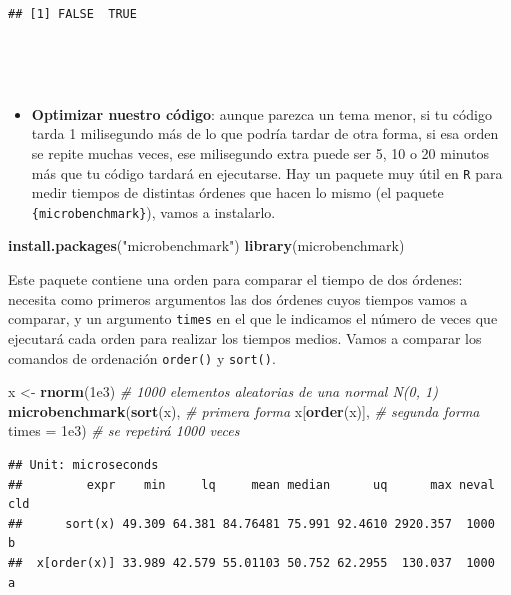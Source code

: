 \documentclass[11pt,]{book}
\newenvironment{Shaded}{\begin{snugshade}}{\end{snugshade}}
\newcommand{\CommentTok}[1]{\textcolor[rgb]{0.37,0.37,0.37}{\textit{#1}}}
\newcommand{\DataTypeTok}[1]{\textcolor[rgb]{0.27,0.27,0.27}{#1}}
\newcommand{\FloatTok}[1]{\textcolor[rgb]{0.06,0.06,0.06}{#1}}
\newcommand{\KeywordTok}[1]{\textcolor[rgb]{0.27,0.27,0.27}{\textbf{#1}}}
\newcommand{\NormalTok}[1]{#1}
\newcommand{\StringTok}[1]{\textcolor[rgb]{0.5,0.5,0.5}{#1}}
\providecommand{\tightlist}{%
  \setlength{\itemsep}{0pt}\setlength{\parskip}{0pt}}
\begin{document}
\begin{verbatim}
## [1] FALSE  TRUE
\end{verbatim}

~

~

\begin{itemize}
\tightlist
\item
  \textbf{Optimizar nuestro código}: aunque parezca un tema menor, si tu código tarda 1 milisegundo más de lo que podría tardar de otra forma, si esa orden se repite muchas veces, ese milisegundo extra puede ser 5, 10 o 20 minutos más que tu código tardará en ejecutarse. Hay un paquete muy útil en \texttt{R} para medir tiempos de distintas órdenes que hacen lo mismo (el paquete \texttt{\{microbenchmark\}}), vamos a instalarlo.
\end{itemize}

\begin{Shaded}
\begin{Highlighting}[]
\KeywordTok{install.packages}\NormalTok{(}\StringTok{"microbenchmark"}\NormalTok{)}
\KeywordTok{library}\NormalTok{(microbenchmark)}
\end{Highlighting}
\end{Shaded}

Este paquete contiene una orden para comparar el tiempo de dos órdenes: necesita como primeros argumentos las dos órdenes cuyos tiempos vamos a comparar, y un argumento \texttt{times} en el que le indicamos el número de veces que ejecutará cada orden para realizar los tiempos medios. Vamos a comparar los comandos de ordenación \texttt{order()} y \texttt{sort()}.

\begin{Shaded}
\begin{Highlighting}[]
\NormalTok{x <-}\StringTok{ }\KeywordTok{rnorm}\NormalTok{(}\FloatTok{1e3}\NormalTok{) }\CommentTok{# 1000 elementos aleatorias de una normal N(0, 1)}
\KeywordTok{microbenchmark}\NormalTok{(}\KeywordTok{sort}\NormalTok{(x), }\CommentTok{# primera forma}
\NormalTok{               x[}\KeywordTok{order}\NormalTok{(x)], }\CommentTok{# segunda forma}
               \DataTypeTok{times =} \FloatTok{1e3}\NormalTok{) }\CommentTok{# se repetirá 1000 veces}
\end{Highlighting}
\end{Shaded}

\begin{verbatim}
## Unit: microseconds
##         expr    min     lq     mean median      uq      max neval cld
##      sort(x) 49.309 64.381 84.76481 75.991 92.4610 2920.357  1000   b
##  x[order(x)] 33.989 42.579 55.01103 50.752 62.2955  130.037  1000  a
\end{verbatim}
\end{document}
